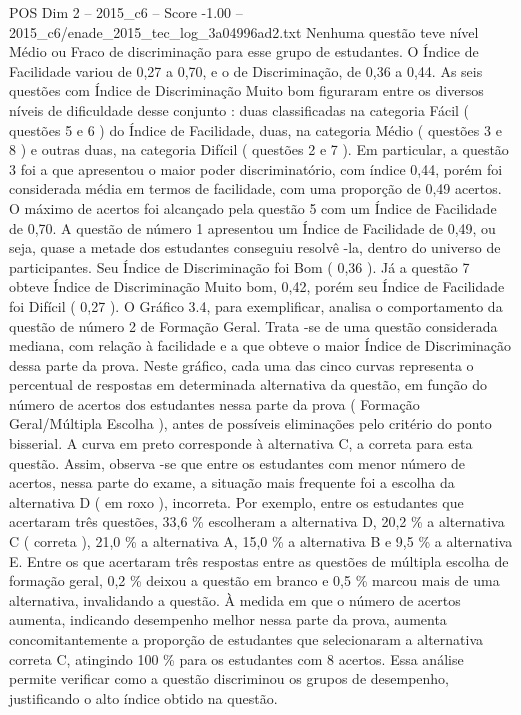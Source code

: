 \begin{textsample}{POS Dim 2 – 2015\_c6 – Score -1.00 – 2015\_c6/enade\_2015\_tec\_log\_3a04996ad2.txt}
Nenhuma questão teve nível Médio ou Fraco de discriminação para esse grupo de estudantes.
O Índice de Facilidade variou de 0,27 a 0,70, e o de Discriminação, de 0,36 a 0,44.
As seis questões com Índice de Discriminação Muito bom figuraram entre os diversos níveis de dificuldade desse conjunto : duas classificadas na categoria Fácil ( questões 5 e 6 ) do Índice de Facilidade, duas, na categoria Médio ( questões 3 e 8 ) e outras duas, na categoria Difícil ( questões 2 e 7 ).
Em particular, a questão 3 foi a que apresentou o maior poder discriminatório, com índice 0,44, porém foi considerada média em termos de facilidade, com uma proporção de 0,49 acertos.
O máximo de acertos foi alcançado pela questão 5 com um Índice de Facilidade de 0,70.
A questão de número 1 apresentou um Índice de Facilidade de 0,49, ou seja, quase a metade dos estudantes conseguiu resolvê -la, dentro do universo de participantes.
Seu Índice de Discriminação foi Bom ( 0,36 ).
Já a questão 7 obteve Índice de Discriminação Muito bom, 0,42, porém seu Índice de Facilidade foi Difícil ( 0,27 ).
O Gráfico 3.4, para exemplificar, analisa o comportamento da questão de número 2 de Formação Geral.
Trata -se de uma questão considerada mediana, com relação à facilidade e a que obteve o maior Índice de Discriminação dessa parte da prova.
Neste gráfico, cada uma das cinco curvas representa o percentual de respostas em determinada alternativa da questão, em função do número de acertos dos estudantes nessa parte da prova ( Formação Geral/Múltipla Escolha ), antes de possíveis eliminações pelo critério do ponto bisserial.
A curva em preto corresponde à alternativa C, a correta para esta questão.
Assim, observa -se que entre os estudantes com menor número de acertos, nessa parte do exame, a situação mais frequente foi a escolha da alternativa D ( em roxo ), incorreta.
Por exemplo, entre os estudantes que acertaram três questões, 33,6 \% escolheram a alternativa D, 20,2 \% a alternativa C ( correta ), 21,0 \% a alternativa A, 15,0 \% a alternativa B e 9,5 \% a alternativa E.
Entre os que acertaram três respostas entre as questões de múltipla escolha de formação geral, 0,2 \% deixou a questão em branco e 0,5 \% marcou mais de uma alternativa, invalidando a questão.
À medida em que o número de acertos aumenta, indicando desempenho melhor nessa parte da prova, aumenta concomitantemente a proporção de estudantes que selecionaram a alternativa correta C, atingindo 100 \% para os estudantes com 8 acertos.
Essa análise permite verificar como a questão discriminou os grupos de desempenho, justificando o alto índice obtido na questão.

\end{textsample}
